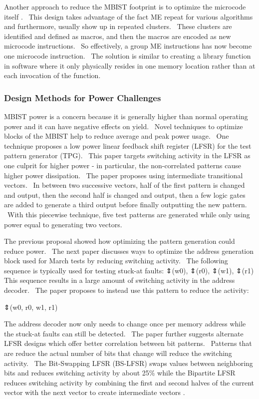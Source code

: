 Another approach to reduce the MBIST footprint is to optimize the microcode itself \cite{5692281}.  This design takes advantage of the fact ME repeat for various algorithms and furthermore, usually show up in repeated clusters.  These clusters are identified and defined as macros, and then the macros are encoded as new microcode instructions.  So effectively, a group ME instructions has now become one microcode instruction.  The solution is similar to creating a library function in software where it only physically resides in one memory location rather than at each invocation of the function.  

\subsubsection{Design Methods for Power Challenges}
MBIST power is a concern because it is generally higher than normal operating power and it can have negative effects on yield.  Novel techniques to optimize blocks of the MBIST help to reduce average and peak power usage.  One technique \cite{oldref-15} proposes a low power linear feedback shift register (LFSR) for the test pattern generator (TPG).  This paper targets switching activity in the LFSR as one culprit for higher power - in particular, the non-correlated patterns cause higher power dissipation.  The paper proposes using intermediate transitional vectors.  In between two successive vectors, half of the first pattern is changed and output, then the second half is changed and output, then a few logic gates are added to generate a third output before finally outputting the new pattern.  With this piecewise technique, five test patterns are generated while only using power equal to generating two vectors.

The previous proposal showed how optimizing the pattern generation could reduce power.  The next paper discusses ways to optimize the address generation block used for March tests by reducing switching activity.  The following sequence is typically used for testing stuck-at faults:
⇕(w0), ⇕(r0), ⇕(w1), ⇕(r1) 
This sequence results in a large amount of switching activity in the address decoder.  The paper proposes to instead use this pattern to reduce the activity:

⇕(w0, r0, w1, r1)

The address decoder now only needs to change once per memory address while the stuck-at faults can still be detected.  The paper further suggests alternate LFSR designs which offer better correlation between bit patterns.  Patterns that are reduce the actual number of bits that change will reduce the switching activity.  The Bit-Swapping LFSR (BS-LFSR) swaps values between neighboring bits and reduces switching activity by about 25\% \cite{4472405} while the Bipartite LFSR reduces switching activity by combining the first and second halves of the current vector with the next vector to create intermediate vectors \cite{oldref-03}.    



